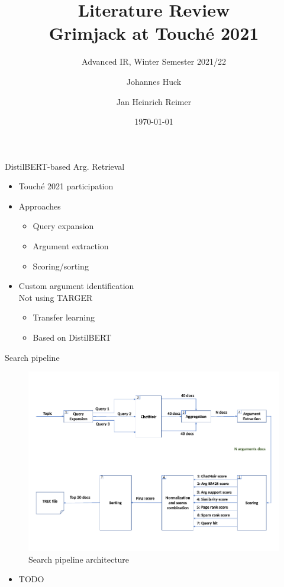\documentclass[english]{mlutalk}
\title{Literature Review\\Grimjack at Touché 2021}
\subtitle{Advanced IR, Winter Semester 2021/22}
\author{Johannes Huck \and Jan Heinrich Reimer}
\institute{Martin Luther University Halle-Wittenberg}
\date{\today}
\begin{document}
\titleframe

\begin{frame}{DistilBERT-based Arg. Retrieval~\cite{AlhamzehBEM2021}}
  \begin{itemize}
    \item Touché 2021 participation
    \item Approaches
    \begin{itemize}
      \item Query expansion
      \item Argument extraction
      \item Scoring/sorting
    \end{itemize}
    \item Custom argument identification \\ Not using TARGER~\cite{ChernodubOHBHBP2019}
    \begin{itemize}
      \item Transfer learning
      \item Based on DistilBERT~\cite{SanhDCW2019}
    \end{itemize}
  \end{itemize}
\end{frame}

\begin{frame}[allowframebreaks]{Search pipeline}
  \begin{figure}
    \centering
    \includegraphics[width=0.8\linewidth]{figures/distilbert-based-arg-retrieval-architecture.pdf}
    \caption{Search pipeline architecture}
    \label{architecture}
  \end{figure}

  \begin{itemize}
    \item TODO
  \end{itemize}
\end{frame}
\end{document}
